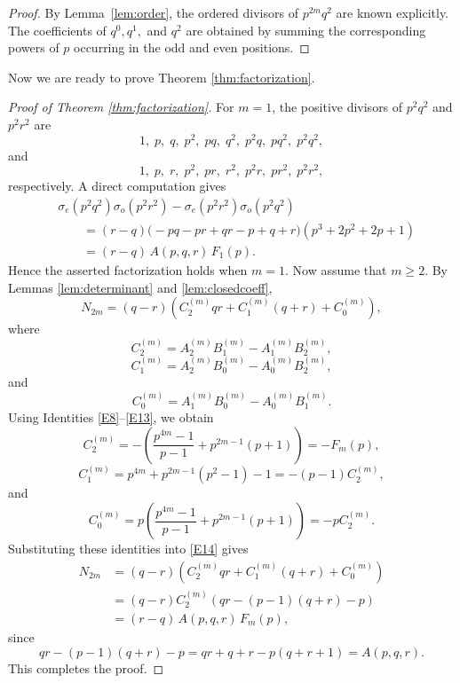 \documentclass[12pt,reqno]{article}
\begin{document}
\begin{proof}
By Lemma~\ref{lem:order}, the ordered divisors of \(p^{2m}q^2\) are known explicitly. The coefficients of \(q^0,q^1,\) and \(q^2\) are obtained by summing the corresponding powers of \(p\) occurring in the odd and even positions.
\end{proof}

Now we are ready to prove Theorem \ref{thm:factorization}.

\begin{proof}[Proof of Theorem \ref{thm:factorization}]
For \(m=1\), the positive divisors of \(p^2q^2\) and \(p^2r^2\) are
\[
1,\; p,\; q,\; p^2,\; pq,\; q^2,\; p^2q,\; pq^2,\; p^2q^2,
\]
and
\[
1,\; p,\; r,\; p^2,\; pr,\; r^2,\; p^2r,\; pr^2,\; p^2r^2,
\]
respectively. A direct computation gives
\[
\begin{aligned}
&\sigma_e(p^{2}q^2)\sigma_o(p^{2}r^2)
-\sigma_e(p^{2}r^2)\sigma_o(p^{2}q^2) \\
&\qquad
=(r-q)\bigl(-pq-pr+qr-p+q+r\bigr)
\left(p^3+2p^2+2p+1\right) \\
&\qquad
=(r-q)\,A(p,q,r)\,F_1(p).
\end{aligned}
\]
Hence the asserted factorization holds when \(m=1\).
Now assume that \(m\ge2\). By Lemmas \ref{lem:determinant} and \ref{lem:closedcoeff},
\begin{equation}\label{E14}
N_{2m}
=
(q-r)
\left(
C_2^{(m)}qr
+
C_1^{(m)}(q+r)
+
C_0^{(m)}
\right),
\end{equation}
where
\[
C_2^{(m)}=A_2^{(m)}B_1^{(m)}-A_1^{(m)}B_2^{(m)},
\]
\[
C_1^{(m)}=A_2^{(m)}B_0^{(m)}-A_0^{(m)}B_2^{(m)},
\]
and
\[
C_0^{(m)}=A_1^{(m)}B_0^{(m)}-A_0^{(m)}B_1^{(m)}.
\]
Using Identities \eqref{E8}--\eqref{E13}, we obtain
\[
C_2^{(m)}
=
-
\left(
\frac{p^{4m}-1}{p-1}
+
p^{2m-1}(p+1)
\right)
=-F_m(p),
\]
\[
C_1^{(m)}
=
p^{4m}+p^{2m-1}(p^2-1)-1
=-(p-1)C_2^{(m)},
\]
and
\[
C_0^{(m)}
=
p
\left(
\frac{p^{4m}-1}{p-1}
+
p^{2m-1}(p+1)
\right)
=-pC_2^{(m)}.
\]
Substituting these identities into \eqref{E14} gives
\[
\begin{aligned}
N_{2m}
&=(q-r)
\left(
C_2^{(m)}qr
+C_1^{(m)}(q+r)
+C_0^{(m)}
\right) \\
&=(q-r)C_2^{(m)}
\left(
qr-(p-1)(q+r)-p
\right) \\
&=(r-q)\,
A(p,q,r)\,
F_m(p),
\end{aligned}
\]
since
\[
qr-(p-1)(q+r)-p
=
qr+q+r-p(q+r+1)
=
A(p,q,r).
\]
This completes the proof.
\end{proof}
\end{document}
